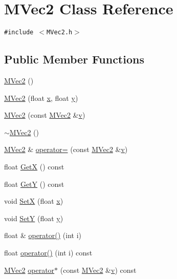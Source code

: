 \hypertarget{class_m_vec2}{
\section{MVec2 Class Reference}
\label{class_m_vec2}
}
{\tt \#include $<$MVec2.h$>$}

\subsection*{Public Member Functions}
\begin{CompactItemize}
\item 
\hyperlink{class_m_vec2_5f7fa1ab60ce17787084fc30c4da182e}{MVec2} ()
\item 
\hyperlink{class_m_vec2_c57b50f9f0f4e94bf2b4b863f000b2f4}{MVec2} (float \hyperlink{wglext_8h_d77deca22f617d3f0e0eb786445689fc}{x}, float \hyperlink{wglext_8h_9298c7ad619074f5285b32c6b72bfdea}{y})
\item 
\hyperlink{class_m_vec2_34d3ade6ee666dec157f5c82ab908db0}{MVec2} (const \hyperlink{class_m_vec2}{MVec2} \&\hyperlink{glext__bak_8h_5cf89b94f7478c0ebc4429b60e7ef93b}{v})
\item 
\hyperlink{class_m_vec2_17095d92765eed4b3e9248d6c2b2a794}{$\sim$MVec2} ()
\item 
\hyperlink{class_m_vec2}{MVec2} \& \hyperlink{class_m_vec2_a41defbde5254e59214c985f922426c2}{operator=} (const \hyperlink{class_m_vec2}{MVec2} \&\hyperlink{glext__bak_8h_5cf89b94f7478c0ebc4429b60e7ef93b}{v})
\item 
float \hyperlink{class_m_vec2_9acc00347809d829118094588c89dd26}{GetX} () const 
\item 
float \hyperlink{class_m_vec2_6899c308d311a8fd1245ae955717720a}{GetY} () const 
\item 
void \hyperlink{class_m_vec2_9cd1d6d7fdb7548c0498fb35b729fd38}{SetX} (float \hyperlink{wglext_8h_d77deca22f617d3f0e0eb786445689fc}{x})
\item 
void \hyperlink{class_m_vec2_476159d9ad1d7392ba93ca2924e8b3a0}{SetY} (float \hyperlink{wglext_8h_9298c7ad619074f5285b32c6b72bfdea}{y})
\item 
float \& \hyperlink{class_m_vec2_98b7c2eee3931148527ad187704e2247}{operator()} (int i)
\item 
float \hyperlink{class_m_vec2_b69d973d47bb3288df0a66277f8b248c}{operator()} (int i) const 
\item 
\hyperlink{class_m_vec2}{MVec2} \hyperlink{class_m_vec2_f9ec6d8fd59885aad4db6d30795a9b0b}{operator$\ast$} (const \hyperlink{class_m_vec2}{MVec2} \&\hyperlink{glext__bak_8h_5cf89b94f7478c0ebc4429b60e7ef93b}{v}) const 

\end{CompactItemize}
